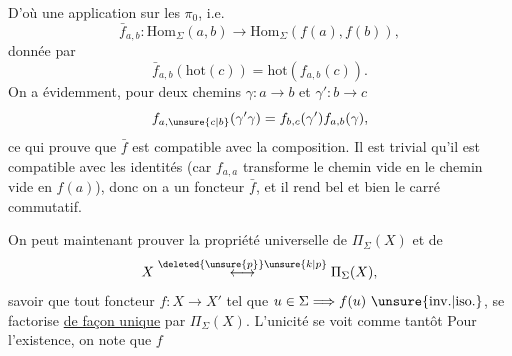 D'où une application sur les $\pi_0$, i.e.
\[\bar f_{a,b}:\mathrm{Hom}_\Sigma(a,b)\longrightarrow\mathrm{Hom}_\Sigma(f(a),f(b)),\]
donnée par
\[\bar f_{a,b}(\mathrm{hot}(c))=\mathrm{hot}(f_{a,b}(c)).\]
On a évidemment, pour deux chemins $\gamma:a\longrightarrow b$ et $\gamma':b\longrightarrow c$
\[f_{a,\unsure{c|b}}(\gamma'\gamma)=f_{b,c}(\gamma')f_{a,b}(\gamma),\]
ce qui prouve que $\bar f$ est compatible avec la composition. Il est trivial qu'il est compatible avec les identités (car $f_{a,a}$ transforme le chemin vide  en le chemin vide en $f(a)$), donc on a un foncteur $\bar f$, et il rend bel et bien le carré commutatif.

On peut maintenant prouver la propriété universelle de $\Pi_\Sigma(X)$ et de
\[X\overset{\deleted{\unsure{p}}\unsure{k|p}}{\longleftrightarrow}\Pi_\Sigma(X),\]
savoir que tout foncteur $f:X\longrightarrow X'$ tel que $u\in\Sigma\Longrightarrow f(u)\ \unsure{\mathrm{inv.}|\mathrm{iso.}}$, se factorise \uline{de façon unique} par $\Pi_\Sigma(X)$. L'unicité
se voit comme tantôt Pour l'existence, on note que $f$  
